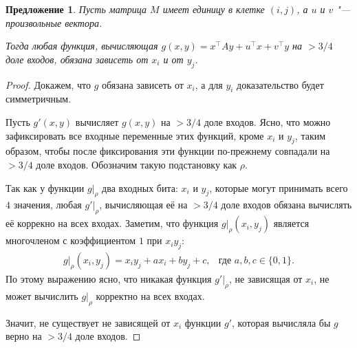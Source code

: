 \documentclass[oneside, a4paper]{article}
\newtheorem{proposition}{Предложение}
\theoremstyle{definition}
\theoremstyle{remark}
\begin{document}
\begin{proposition} \label{single_one}
Пусть матрица $M$ имеет единицу в клетке $(i, j)$, а $u$ и $v$ "--- произвольные
вектора.

Тогда любая функция, вычисляющая $g(x, y) = x^\top A y + u^\top x + v^\top y$ на
$> 3/4$ доле входов, обязана зависеть от $x_i$ и от $y_j$.
\end{proposition}
\begin{proof}
Докажем, что $g$ обязана зависеть от $x_i$, а для $y_i$ доказательство будет
симметричным.

Пусть $g'(x, y)$ вычисляет $g(x, y)$ на $> 3/4$ доле входов. Ясно, что можно
зафиксировать все входные переменные этих функций, кроме $x_i$ и $y_j$, таким
образом, чтобы после фиксирования эти функции по-прежнему совпадали на $> 3/4$
доле входов. Обозначим такую подстановку как $\rho$.

Так как у функции $g \rvert _ \rho$ два входных бита: $x_i$ и $y_j$, которые
могут принимать всего $4$ значения, любая $g' \rvert _ \rho$, вычисляющая
её на $> 3/4$ доле входов обязана вычислять её коррекно на всех входах. Заметим,
что функция $g \rvert _ \rho(x_i, y_j)$ является многочленом с коэффициентом $1$
при $x_i y_j$:
\[
\begin{aligned}
&g \rvert _ \rho (x_i, y_j) = x_i y_j + a x_i + b y_j + c,
&
\text{где $a, b, c \in \{0, 1\}$.}&
\end{aligned}
\]
По этому выражению ясно, что никакая функция $g' \rvert _ \rho$, не зависящая от
$x_i$, не может вычислить $g \rvert _ \rho$ корректно на всех входах.

Значит, не существует не зависящей от $x_i$ функции $g'$, которая вычисляла бы
$g$ верно на $> 3/4$ доле входов.
\end{proof}
\end{document}
